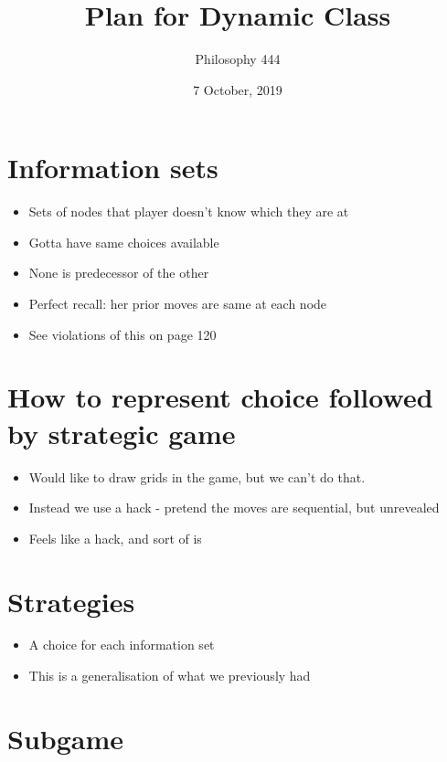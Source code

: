 \documentclass[11pt,]{article}
\title{Plan for Dynamic Class}
\author{Philosophy 444}
\date{7 October, 2019}
\providecommand{\tightlist}{%
  \setlength{\itemsep}{0pt}\setlength{\parskip}{0pt}}
\begin{document}
\maketitle

\hypertarget{information-sets}{%
\section{Information sets}\label{information-sets}}

\begin{itemize}
\tightlist
\item
  Sets of nodes that player doesn't know which they are at
\item
  Gotta have same choices available
\item
  None is predecessor of the other
\item
  Perfect recall: her prior moves are same at each node
\item
  See violations of this on page 120
\end{itemize}

\hypertarget{how-to-represent-choice-followed-by-strategic-game}{%
\section{How to represent choice followed by strategic
game}\label{how-to-represent-choice-followed-by-strategic-game}}

\begin{itemize}
\tightlist
\item
  Would like to draw grids in the game, but we can't do that.
\item
  Instead we use a hack - pretend the moves are sequential, but
  unrevealed
\item
  Feels like a hack, and sort of is
\end{itemize}

\hypertarget{strategies}{%
\section{Strategies}\label{strategies}}

\begin{itemize}
\tightlist
\item
  A choice for each information set
\item
  This is a generalisation of what we previously had
\end{itemize}

\hypertarget{subgame}{%
\section{Subgame}\label{subgame}}
\end{document}
